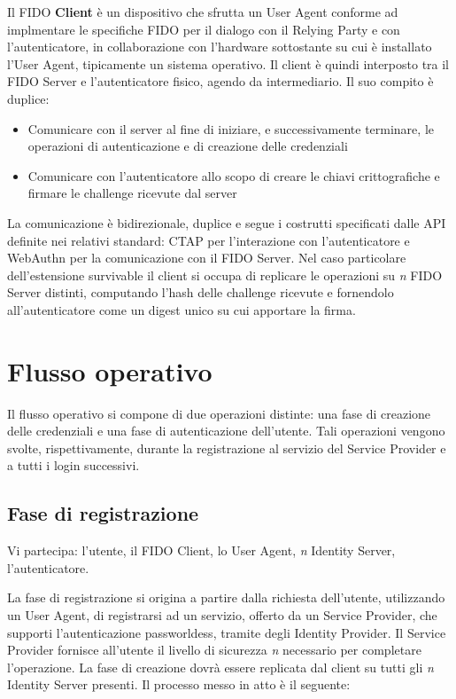 Il FIDO \textbf{Client} è un dispositivo che sfrutta un User Agent conforme ad implmentare le specifiche FIDO per il dialogo con il Relying Party e con l'autenticatore, in collaborazione con l'hardware sottostante su cui è installato l'User Agent, tipicamente un sistema operativo. Il client è quindi interposto tra il FIDO Server e l'autenticatore fisico, agendo da intermediario. Il suo compito è duplice:
\begin{itemize}
	\item Comunicare con il server al fine di iniziare, e successivamente terminare, le operazioni di autenticazione e di creazione delle credenziali 
	\item Comunicare con l'autenticatore allo scopo di creare le chiavi crittografiche e firmare le challenge ricevute dal server
\end{itemize}
La comunicazione è bidirezionale, duplice e segue i costrutti specificati dalle API definite nei relativi standard: CTAP per l'interazione con l'autenticatore e WebAuthn per la comunicazione con il FIDO Server. 
Nel caso particolare dell'estensione survivable il client si occupa di replicare le operazioni su \emph{n} FIDO Server distinti, computando l'hash delle challenge ricevute e fornendolo all'autenticatore come un digest unico su cui apportare la firma. 


\section{Flusso operativo}
\label{flusso_operativo}

Il flusso operativo si compone di due operazioni distinte: una fase di creazione delle credenziali e una fase di autenticazione dell'utente. Tali operazioni vengono svolte, rispettivamente, durante la registrazione al servizio del Service Provider e a tutti i login successivi.

\subsection{Fase di registrazione}
\label{registrazione}

Vi partecipa: l'utente, il FIDO Client, lo User Agent, \emph{n} Identity Server, l'autenticatore.

La fase di registrazione si origina a partire dalla richiesta dell'utente, utilizzando un User Agent, di registrarsi ad un servizio, offerto da un Service Provider, che supporti l'autenticazione passworldess, tramite degli Identity Provider. Il Service Provider fornisce all'utente il livello di sicurezza \emph{n} necessario per completare l'operazione. La fase di creazione dovrà essere replicata dal client su tutti gli \emph{n} Identity Server presenti.  Il processo messo in atto è il seguente:

